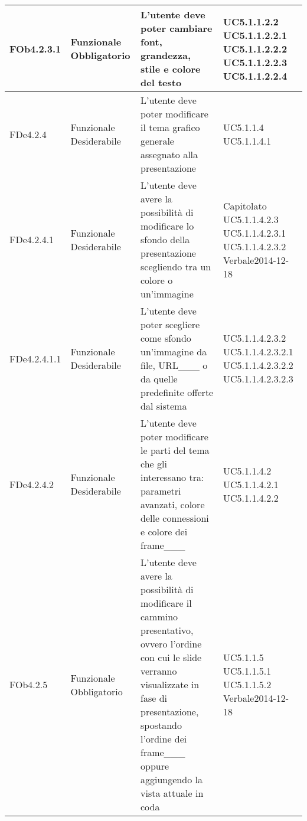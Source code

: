 \begin{longtable}{|l|p{2.5cm}|p{5cm}|p{3.5cm}|}
\hline
FOb4.2.3.1 & Funzionale \linebreak Obbligatorio & L'utente deve poter cambiare font, grandezza, stile e colore del testo  & UC5.1.1.2.2 \linebreak  UC5.1.1.2.2.1 \linebreak  UC5.1.1.2.2.2 \linebreak  UC5.1.1.2.2.3 \linebreak  UC5.1.1.2.2.4 \linebreak  \\
\hline
FDe4.2.4 & Funzionale \linebreak Desiderabile & L'utente deve poter modificare il tema grafico generale assegnato alla presentazione & UC5.1.1.4 \linebreak  UC5.1.1.4.1 \linebreak  \\
\hline
FDe4.2.4.1 & Funzionale \linebreak Desiderabile & L'utente deve avere la possibilità di modificare lo sfondo della presentazione scegliendo tra un colore o un'immagine & Capitolato \linebreak  UC5.1.1.4.2.3 \linebreak  UC5.1.1.4.2.3.1 \linebreak  UC5.1.1.4.2.3.2 \linebreak  Verbale2014-12-18 \linebreak  \\
\hline
FDe4.2.4.1.1 & Funzionale \linebreak Desiderabile & L'utente deve poter scegliere come sfondo un'immagine da file, URL___ o da quelle predefinite offerte dal sistema & UC5.1.1.4.2.3.2 \linebreak  UC5.1.1.4.2.3.2.1 \linebreak  UC5.1.1.4.2.3.2.2 \linebreak  UC5.1.1.4.2.3.2.3 \linebreak  \\
\hline
FDe4.2.4.2 & Funzionale \linebreak Desiderabile & L'utente deve poter modificare le parti del tema che gli interessano tra: parametri avanzati, colore delle connessioni e colore dei frame___ & UC5.1.1.4.2 \linebreak  UC5.1.1.4.2.1 \linebreak  UC5.1.1.4.2.2 \linebreak  \\
\hline
FOb4.2.5 & Funzionale \linebreak Obbligatorio & L'utente deve avere la possibilità di modificare il cammino presentativo, ovvero l'ordine con cui le slide verranno visualizzate in fase di presentazione, spostando l'ordine dei frame___ oppure aggiungendo la vista attuale in coda & UC5.1.1.5 \linebreak  UC5.1.1.5.1 \linebreak  UC5.1.1.5.2 \linebreak  Verbale2014-12-18 \linebreak  \\

\end{longtable}
